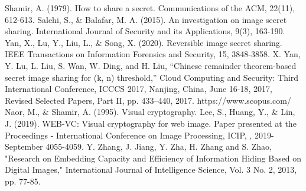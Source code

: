 \documentclass[a4paper,article,14pt]{extarticle}
\begin{document}
\newpage    
\begin{thebibliography}{1}
 Shamir, A. (1979). How to share a secret. Communications of the ACM, 22(11), 612-613.
 Salehi, S., \& Balafar, M. A. (2015). An investigation on image secret sharing. International Journal of Security and its Applications, 9(3), 163-190.
 Yan, X., Lu, Y., Liu, L., \& Song, X. (2020). Reversible image secret sharing. IEEE Transactions on Information Forensics and Security, 15, 3848-3858.
 X. Yan, Y. Lu, L. Liu, S. Wan, W. Ding, and H. Liu,
“Chinese remainder theorem-based secret image sharing for (k,
n) threshold,” Cloud Computing and Security: Third International
Conference, ICCCS 2017, Nanjing, China, June 16-18, 2017, Revised
Selected Papers, Part II, pp. 433–440, 2017.
 https://www.scopus.com/
 Naor, M., \& Shamir, A. (1995). Visual cryptography.
 Lee, S., Huang, Y., \& Lin, J. (2019). WEB-VC: Visual cryptography for web image. Paper presented at the Proceedings - International Conference on Image Processing, ICIP, , 2019-September 4055-4059.
 Y. Zhang, J. Jiang, Y. Zha, H. Zhang and S. Zhao, "Research on Embedding Capacity and Efficiency of Information Hiding Based on Digital Images," International Journal of Intelligence Science, Vol. 3 No. 2, 2013, pp. 77-85.
\end{thebibliography}
\end{document}
